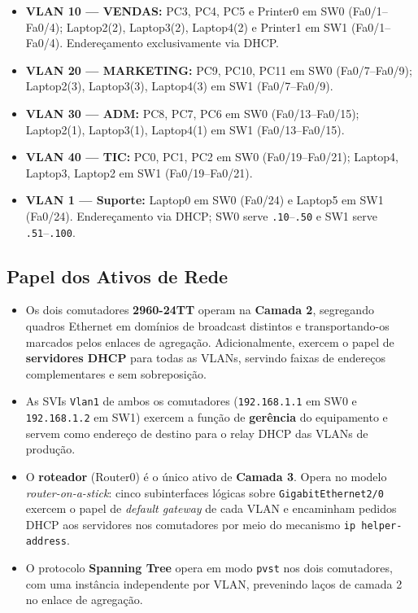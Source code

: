 \begin{itemize}[leftmargin=2em]
  \item \textbf{VLAN 10 --- VENDAS:} PC3, PC4, PC5 e Printer0 em SW0
        (Fa0/1--Fa0/4); Laptop2(2), Laptop3(2), Laptop4(2) e Printer1 em SW1
        (Fa0/1--Fa0/4). Endereçamento exclusivamente via DHCP.

  \item \textbf{VLAN 20 --- MARKETING:} PC9, PC10, PC11 em SW0 (Fa0/7--Fa0/9);
        Laptop2(3), Laptop3(3), Laptop4(3) em SW1 (Fa0/7--Fa0/9).

  \item \textbf{VLAN 30 --- ADM:} PC8, PC7, PC6 em SW0 (Fa0/13--Fa0/15);
        Laptop2(1), Laptop3(1), Laptop4(1) em SW1 (Fa0/13--Fa0/15).

  \item \textbf{VLAN 40 --- TIC:} PC0, PC1, PC2 em SW0 (Fa0/19--Fa0/21);
        Laptop4, Laptop3, Laptop2 em SW1 (Fa0/19--Fa0/21).

  \item \textbf{VLAN 1 --- Suporte:} Laptop0 em SW0 (Fa0/24) e Laptop5 em SW1
        (Fa0/24). Endereçamento via DHCP; SW0 serve \texttt{.10}--\texttt{.50} e
        SW1 serve \texttt{.51}--\texttt{.100}.
\end{itemize}

\subsection{Papel dos Ativos de Rede}

\begin{itemize}[leftmargin=2em]
  \item Os dois comutadores \textbf{2960-24TT} operam na \textbf{Camada 2}, segregando
        quadros Ethernet em domínios de broadcast distintos e transportando-os marcados
        pelos enlaces de agregação. Adicionalmente, exercem o papel de
        \textbf{servidores DHCP} para todas as VLANs, servindo faixas de endereços
        complementares e sem sobreposição.

  \item As SVIs \texttt{Vlan1} de ambos os comutadores
        (\texttt{192.168.1.1} em SW0 e \texttt{192.168.1.2} em SW1) exercem a
        função de \textbf{gerência} do equipamento e servem como endereço de destino
        para o relay DHCP das VLANs de produção.

  \item O \textbf{roteador} (Router0) é o único ativo de \textbf{Camada 3}. Opera
        no modelo \textit{router-on-a-stick}: cinco subinterfaces lógicas sobre
        \texttt{GigabitEthernet2/0} exercem o papel de \textit{default gateway}
        de cada VLAN e encaminham pedidos DHCP aos servidores nos comutadores
        por meio do mecanismo \texttt{ip helper-address}.

  \item O protocolo \textbf{Spanning Tree} opera em modo \texttt{pvst} nos dois
        comutadores, com uma instância independente por VLAN, prevenindo laços de
        camada 2 no enlace de agregação.
\end{itemize}

